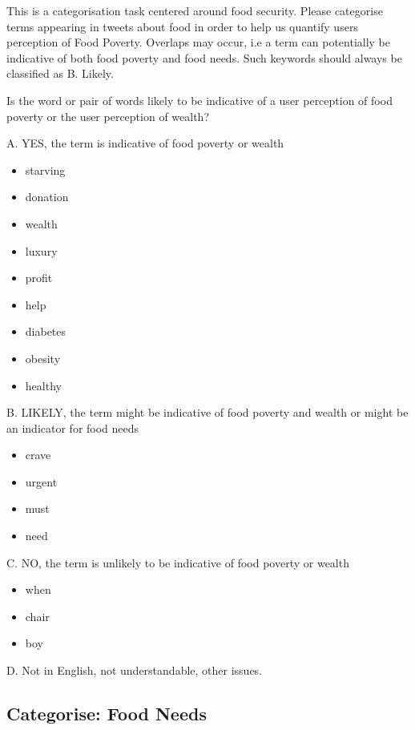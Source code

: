 This is a categorisation task centered around food security. Please categorise terms appearing in tweets about food in order to help us quantify users perception of Food Poverty. Overlaps may occur, i.e a term can potentially be indicative of both food poverty and food needs. Such keywords should always be classified as B. Likely.

Is the word or pair of words likely to be indicative of a user perception of food poverty or the user perception of wealth?

A. YES, the term is indicative of food poverty or wealth

\begin{itemize}

  \item starving
  \item donation
  \item wealth 
  \item luxury
  \item profit
  \item help
  \item diabetes
  \item obesity
  \item healthy

\end{itemize}

B. LIKELY, the term might be indicative of food poverty and wealth or might be an indicator for food needs\begin{itemize}
  \item crave
  \item urgent
  \item must
  \item need 
\end{itemize}

C. NO, the term is unlikely to be indicative of food poverty or wealth

\begin{itemize}
  \item when
  \item chair
  \item boy
\end{itemize}

D. Not in English, not understandable, other issues.



\subsection{Categorise: Food Needs}

